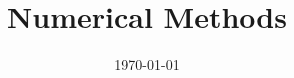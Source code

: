 \documentclass[a4paper,landscape,8pt]{extarticle}
\title{Numerical Methods}
\date{\today}
\begin{document}
\setlength{\belowdisplayskip}{4pt} \setlength{\belowdisplayshortskip}{4pt}
\setlength{\abovedisplayskip}{4pt} \setlength{\abovedisplayshortskip}{4pt}

\graphicspath{ {./img/} }

\allowdisplaybreaks

\begin{multicols*}{4}
\raggedcolumns

\maketitle

\setcounter{tocdepth}{2}










\end{multicols*}
\end{document}
